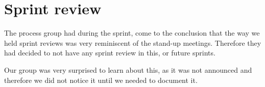 \section{Sprint review} \label{SEC:sprint3review}
The process group had during the sprint, come to the conclusion that the way we held sprint reviews was very reminiscent of the stand-up meetings.
Therefore they had decided to not have any sprint review in this, or future sprints. 

Our group was very surprised to learn about this, as it was not announced and therefore we did not notice it until we needed to document it.

